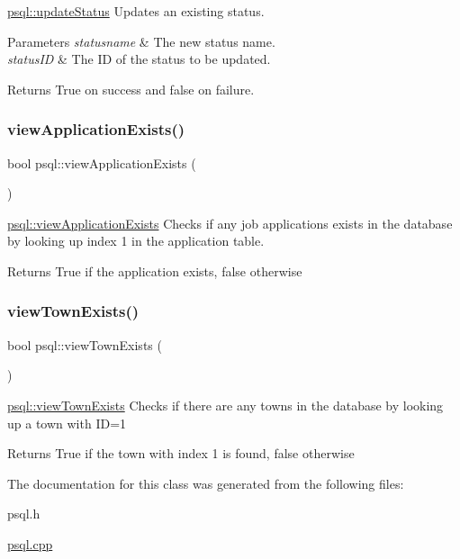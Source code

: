 \mbox{\hyperlink{classpsql_a620364c99c98e20720908deb045536a0}{psql\+::update\+Status}} Updates an existing status. 


\begin{DoxyParams}{Parameters}
{\em statusname} & The new status name. \\
\hline
{\em status\+ID} & The ID of the status to be updated. \\
\hline
\end{DoxyParams}
\begin{DoxyReturn}{Returns}
True on success and false on failure. 
\end{DoxyReturn}
\mbox{\label{classpsql_a4c23d467c41e155a55c38b1cefb9b54b}} 
\subsubsection{\texorpdfstring{viewApplicationExists()}{viewApplicationExists()}}
{\footnotesize\ttfamily bool psql\+::view\+Application\+Exists (\begin{DoxyParamCaption}{ }\end{DoxyParamCaption})}



\mbox{\hyperlink{classpsql_a4c23d467c41e155a55c38b1cefb9b54b}{psql\+::view\+Application\+Exists}} Checks if any job applications exists in the database by looking up index 1 in the application table. 

\begin{DoxyReturn}{Returns}
True if the application exists, false otherwise 
\end{DoxyReturn}
\mbox{\label{classpsql_aae95eb2a505c1b0b7b4d5671926ecd2f}} 
\subsubsection{\texorpdfstring{viewTownExists()}{viewTownExists()}}
{\footnotesize\ttfamily bool psql\+::view\+Town\+Exists (\begin{DoxyParamCaption}{ }\end{DoxyParamCaption})}



\mbox{\hyperlink{classpsql_aae95eb2a505c1b0b7b4d5671926ecd2f}{psql\+::view\+Town\+Exists}} Checks if there are any towns in the database by looking up a town with ID=1 

\begin{DoxyReturn}{Returns}
True if the town with index 1 is found, false otherwise 
\end{DoxyReturn}


The documentation for this class was generated from the following files\+:\begin{DoxyCompactItemize}
\item 
psql.\+h\item 
\mbox{\hyperlink{psql_8cpp}{psql.\+cpp}}\end{DoxyCompactItemize}
